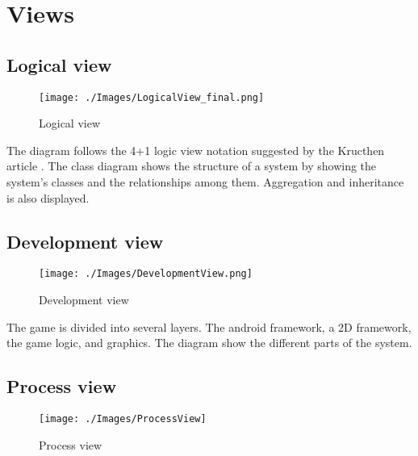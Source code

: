 \pagebreak

\section{Views}
\subsection{Logical view}
\label{section:logical_view}

\begin{figure}[H]
\begin{center}
\texttt{[image: ./Images/LogicalView\_final.png]}
\end{center}
\caption{Logical view}
\end{figure}

The diagram follows the 4+1 logic view notation suggested by the Kructhen article \cite{krutchen}. The class diagram shows the structure of a system by showing the system's classes  and the relationships among them. Aggregation and inheritance is also displayed.

\subsection{Development view}

\begin{figure}[H]
\begin{center}
\texttt{[image: ./Images/DevelopmentView.png]}
\end{center}
\caption{Development view}
\end{figure}

The game is divided into several layers. The android framework, a 2D framework, the game logic, and graphics. The diagram show the different parts of the system.

\pagebreak

\subsection{Process view}

\begin{figure}[H]
\begin{center}
\texttt{[image: ./Images/ProcessView]}
\end{center}
\caption{Process view}
\end{figure}

